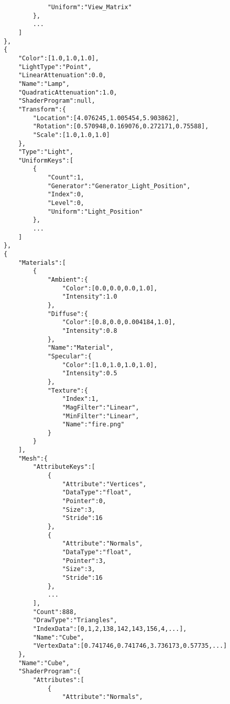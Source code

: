 \begin{verbatim}
                    "Uniform":"View_Matrix"
                },
                ...
            ]
        },
        {
            "Color":[1.0,1.0,1.0],
            "LightType":"Point",
            "LinearAttenuation":0.0,
            "Name":"Lamp",
            "QuadraticAttenuation":1.0,
            "ShaderProgram":null,
            "Transform":{
                "Location":[4.076245,1.005454,5.903862],
                "Rotation":[0.570948,0.169076,0.272171,0.75588],
                "Scale":[1.0,1.0,1.0]
            },
            "Type":"Light",
            "UniformKeys":[
                {
                    "Count":1,
                    "Generator":"Generator_Light_Position",
                    "Index":0,
                    "Level":0,
                    "Uniform":"Light_Position"
                },
                ...
            ]
        },
        {
            "Materials":[
                {
                    "Ambient":{
                        "Color":[0.0,0.0,0.0,1.0],
                        "Intensity":1.0
                    },
                    "Diffuse":{
                        "Color":[0.8,0.0,0.004184,1.0],
                        "Intensity":0.8
                    },
                    "Name":"Material",
                    "Specular":{
                        "Color":[1.0,1.0,1.0,1.0],
                        "Intensity":0.5
                    },
                    "Texture":{
                        "Index":1,
                        "MagFilter":"Linear",
                        "MinFilter":"Linear",
                        "Name":"fire.png"
                    }
                }
            ],
            "Mesh":{
                "AttributeKeys":[
                    {
                        "Attribute":"Vertices",
                        "DataType":"float",
                        "Pointer":0,
                        "Size":3,
                        "Stride":16
                    },
                    {
                        "Attribute":"Normals",
                        "DataType":"float",
                        "Pointer":3,
                        "Size":3,
                        "Stride":16
                    },
                    ...
                ],
                "Count":888,
                "DrawType":"Triangles",
                "IndexData":[0,1,2,138,142,143,156,4,...],
                "Name":"Cube",
                "VertexData":[0.741746,0.741746,3.736173,0.57735,...]
            },
            "Name":"Cube",
            "ShaderProgram":{
                "Attributes":[
                    {
                        "Attribute":"Normals",

\end{verbatim}
